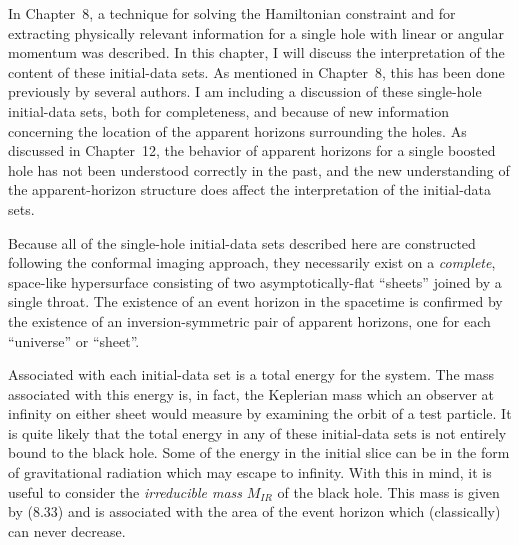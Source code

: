 In Chapter~8, a technique for solving the Hamiltonian constraint and for
extracting physically relevant information for a single hole with linear or
angular momentum was described.  In this chapter, I will discuss the
interpretation of the content of these initial-data sets.  As mentioned in
Chapter~8, this has been done previously by several authors.  I am including a
discussion of these single-hole initial-data sets, both for completeness, and
because of new information concerning the location of the apparent horizons
surrounding the holes.  As discussed in Chapter~12, the behavior of apparent
horizons for a single boosted hole has not been understood correctly in the past,
and the new understanding of the apparent-horizon structure does affect the
interpretation of the initial-data sets.

Because all of the single-hole initial-data sets described here are constructed
following the conformal imaging approach, they necessarily exist on a
{\it complete}, space-like hypersurface consisting of two asymptotically-flat
``sheets'' joined by a single throat.  The existence of an event horizon in the
spacetime is confirmed by the existence of an inversion-symmetric pair of
apparent horizons, one for each ``universe'' or ``sheet''.

Associated with each initial-data set is a total energy for the system.  The mass
associated with this energy is, in fact, the Keplerian mass which an observer at
infinity on either sheet would measure by examining the orbit of a test
particle.  It is quite likely that the total energy in any of these initial-data
sets is not entirely bound to the black hole.  Some of the energy in the initial
slice can be in the form of gravitational radiation which may escape to
infinity.  With this in mind, it is useful to consider the {\it irreducible
mass} $M_{\scriptscriptstyle IR}$ of the black hole.  This mass is given by
(8.33) and is associated with the area of the event horizon which (classically)
can never decrease.

